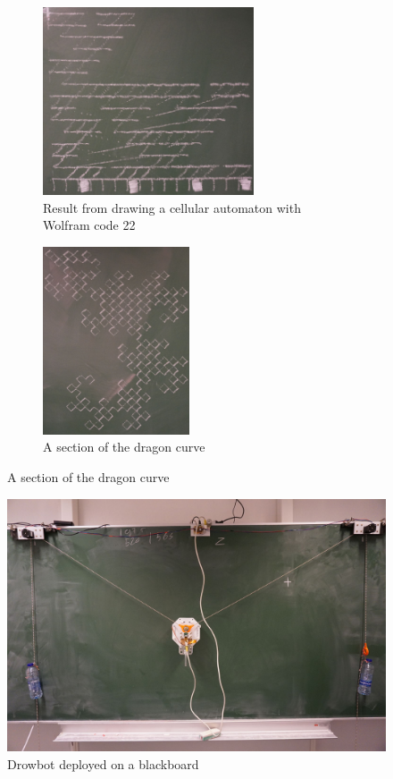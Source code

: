 \documentclass[a4paper,10pt]{article}
\begin{document}
\begin{figure}[h!]
  \centering
  \begin{subfigure}[t]{0.55\textwidth}
    \centering
    \includegraphics[height=15em]{img/ca_res.jpg}
    \caption{Result from drawing a cellular automaton with Wolfram code 22}
    \label{fig:ca_res}
  \end{subfigure}
  \begin{subfigure}[t]{0.4\textwidth}
    \centering
    \includegraphics[height=15em]{img/dragon_curve.jpg}
    \caption{A section of the dragon curve}
    \label{fig:drag_curve}
  \end{subfigure}
\end{figure}

\begin{figure}[h!]
  \centering
  \includegraphics{img/overview_rs.jpg}
  \caption{Drowbot deployed on a blackboard}
  \label{fig:overview}
\end{figure}
\end{document}
